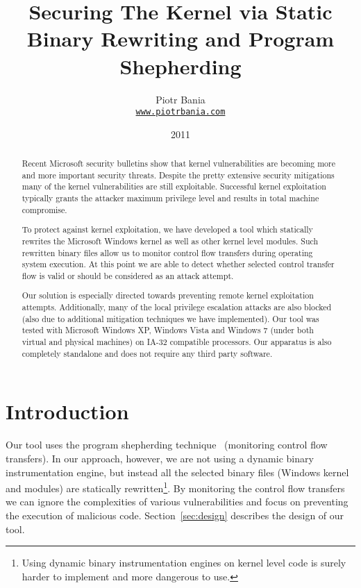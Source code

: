 \documentclass[10pt,twocolumn,a4paper]{article}
\title{Securing The Kernel via Static Binary Rewriting and Program Shepherding}
\author{Piotr Bania\\
\texttt{\href{http://www.piotrbania.com}{www.piotrbania.com}}}
\date{2011}
\begin{document}
\maketitle


\begin{abstract}

Recent Microsoft security bulletins show that kernel vulnerabilities are becoming more and more important security threats. Despite the pretty extensive security mitigations many of the kernel vulnerabilities are still exploitable. Successful kernel exploitation typically grants the attacker maximum privilege level and results in total machine compromise.

To protect against kernel exploitation, we have developed a tool which statically rewrites the Microsoft Windows kernel as well as other kernel level modules. Such rewritten binary files allow us to monitor control flow transfers during operating system execution. At this point we are able to detect whether selected control transfer flow is valid or should be considered as an attack attempt.

Our solution is especially directed towards preventing remote kernel exploitation attempts. Additionally, many of the local privilege escalation attacks are also blocked (also due to additional mitigation techniques we have implemented). Our tool was tested with Microsoft Windows XP, Windows Vista and Windows 7 (under both virtual and physical machines) on IA-32 compatible processors. Our apparatus is also completely standalone and does not require any third party software.
\end{abstract}

\section{Introduction}

Our tool uses the program shepherding technique~\cite{ProgramShep} (monitoring
control flow transfers). In our approach, however, we are not using a dynamic binary instrumentation engine, but instead all the selected binary files (Windows kernel and modules) are statically rewritten\footnote{Using dynamic binary instrumentation engines on kernel level code is surely harder to implement and more dangerous to use.}. By monitoring the control flow transfers we can ignore the complexities of various vulnerabilities and focus on preventing the execution of malicious code. Section~\ref{sec:design} describes the design of our tool.
\end{document}
